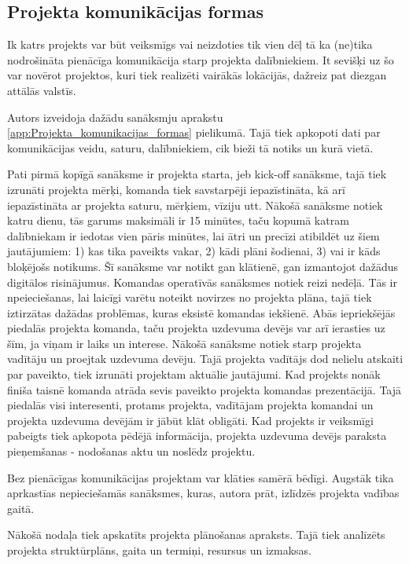 \subsection{Projekta komunikācijas formas}
Ik katrs projekts var būt veiksmīgs vai neizdoties tik vien dēļ tā ka (ne)tika nodrošināta
pienācīga komunikācija starp projekta dalībniekiem. It sevišķi uz šo var novērot projektos, kuri tiek
realizēti vairākās lokācijās, dažreiz pat diezgan attālās valstīs.
\par
Autors izveidoja dažādu sanāksmju aprakstu \ref{app:Projekta_komunikacijas_formas} pielikumā. Tajā tiek apkopoti
dati par komunikācijas veidu, saturu, dalībniekiem, cik bieži tā notiks un kurā vietā.
\par
Pati pirmā kopīgā sanāksme ir projekta starta, jeb kick-off sanāksme, tajā tiek izrunāti projekta mērķi, komanda
tiek savstarpēji iepazīstināta, kā arī iepazīstināta ar projekta saturu, mērķiem, vīziju utt.
Nākošā sanāksme notiek katru dienu, tās garums maksimāli ir 15 minūtes, taču kopumā katram dalībniekam ir iedotas vien
pāris minūtes, lai ātri un precīzi atibildēt uz šiem jautājumiem: 1) kas tika paveikts vakar, 2) kādi plāni šodienai,
3) vai ir kāds bloķējošs notikums. Šī sanāksme var notikt gan klātienē, gan izmantojot dažādus digitālos risinājumus.
Komandas operatīvās sanāksmes notiek reizi nedēļā. Tās ir npeieciešanas, lai laicīgi varētu noteikt novirzes no
projekta plāna, tajā tiek iztirzātas dažādas problēmas, kuras eksistē komandas iekšienē. Abās iepriekšējās piedalās
projekta komanda, taču projekta uzdevuma devējs var arī ierasties uz šīm, ja viņam ir laiks un interese.
Nākošā sanāksme notiek starp projekta vadītāju un proejtak uzdevuma devēju. Tajā projekta vadītājs dod nelielu
atskaiti par paveikto, tiek izrunāti projektam aktuālie jautājumi. Kad projekts nonāk finiša taisnē komanda atrāda 
sevis paveikto projekta komandas prezentācijā. Tajā piedalās visi interesenti, protams projekta, vadītājam projekta
komandai un projekta uzdevuma devējām ir jābūt klāt obligāti. Kad projekts ir veiksmīgi pabeigts tiek apkopota pēdējā
informācija, projekta uzdevuma devējs paraksta pieņemšanas - nodošanas aktu un noslēdz projektu.
\par
Bez pienācīgas komunikācijas projektam var klāties samērā bēdīgi. Augstāk tika aprkastīas nepieciešamās sanāksmes, kuras,
autora prāt, izlīdzēs projekta vadības gaitā.
\par
Nākošā nodaļa tiek apskatīts projekta plānošanas apraksts. Tajā tiek analīzēts projekta struktūrplāns, gaita un termiņi,
resursus un izmaksas.
